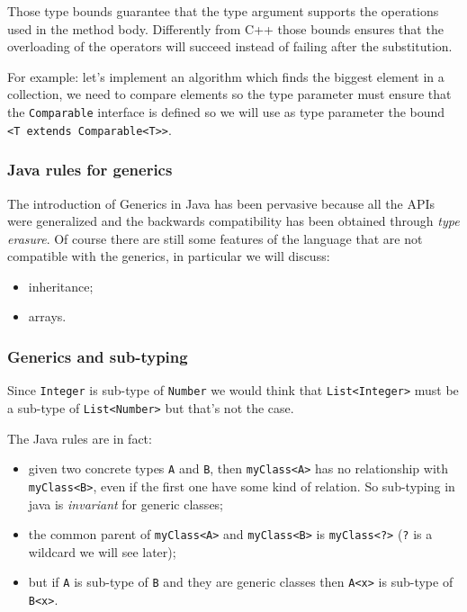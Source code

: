 Those type bounds guarantee that the type argument supports the operations used in the method body.
Differently from C++ those bounds ensures that the overloading of the operators will succeed instead of failing after the substitution.

For example: let's implement an algorithm which finds the biggest element in a collection, we need to compare elements so the type parameter must ensure that the \verb|Comparable| interface is defined so we will use as type parameter the bound \verb|<T extends Comparable<T>>|.

\subsubsection{Java rules for generics}
The introduction of Generics in Java has been pervasive because all the APIs were generalized and the backwards compatibility has been obtained through \emph{type erasure}.
Of course there are still some features of the language that are not compatible with the generics, in particular we will discuss:
\begin{itemize}
    \item inheritance;
    \item arrays.
\end{itemize}

\subsubsection{Generics and sub-typing}
Since \verb|Integer| is sub-type of \verb|Number| we would think that \verb|List<Integer>| must be a sub-type of \verb|List<Number>| but that's not the case.

The Java rules are in fact:
\begin{itemize}
    \item given two concrete types \verb|A| and \verb|B|, then \verb|myClass<A>| has no relationship with \verb|myClass<B>|, even if the first one have some kind of relation.
    So sub-typing in java is \emph{invariant} for generic classes;

    \item the common parent of \verb|myClass<A>| and \verb|myClass<B>| is \verb|myClass<?>| (\verb|?| is a wildcard we will see later);

    \item but if \verb|A| is sub-type of \verb|B| and they are generic classes then \verb|A<x>| is sub-type of \verb|B<x>|.
\end{itemize}

